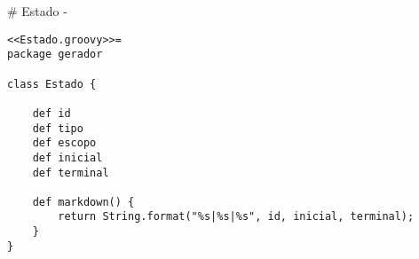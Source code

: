 # Estado {-}

\begin{lstlisting}
<<Estado.groovy>>=
package gerador

class Estado {

    def id
    def tipo
    def escopo
    def inicial
    def terminal

    def markdown() {
        return String.format("%s|%s|%s", id, inicial, terminal);
    }
}

\end{lstlisting}



